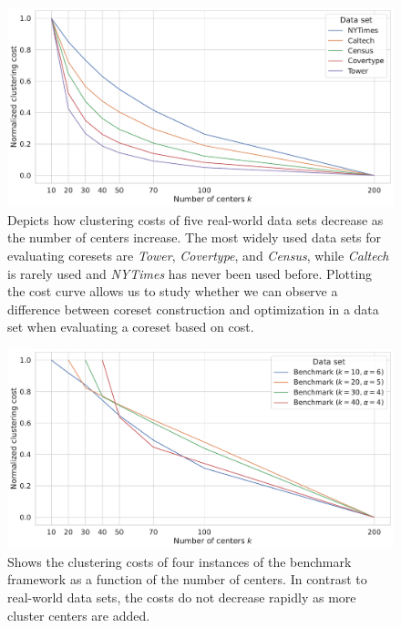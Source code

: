 \begin{figure}
  \caption{Depicts how clustering costs of five real-world data sets decrease as the number of centers increase. 
  The most widely used data sets for evaluating coresets are \textit{Tower}, \textit{Covertype}, and \textit{Census}, while \textit{Caltech} is rarely used and \textit{NYTimes} has never been used before.
  Plotting the cost curve allows us to study whether we can observe a difference between coreset construction and optimization in a data set when evaluating a coreset based on cost.
  }
  \label{fig:cost-curves-real-world-datasets}
  \includegraphics[width=1\linewidth]{figures/cost-curves-real-world-datasets.pdf}
\end{figure}


\begin{figure}
  \caption{Shows the clustering costs of four instances of the benchmark framework as a function of the number of centers. In contrast to real-world data sets, the costs do not decrease rapidly as more cluster centers are added.
  }
  \label{fig:cost-curves-benchmark}
  \includegraphics[width=1\linewidth]{figures/cost-curves-benchmark.pdf}
\end{figure}



